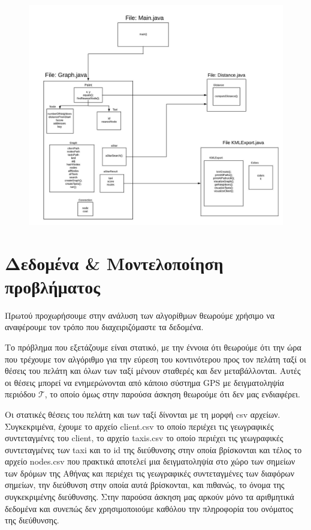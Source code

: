 \documentclass[a4paper,oneside, 11pt]{article}
\begin{document}
\begin{figure}[H]

\includegraphics[width=\textwidth]{architecture.jpeg}
\end{figure}




\section{Δεδομένα \& Μοντελοποίηση προβλήματος}
Πρωτού προχωρήσουμε στην ανάλυση των αλγορίθμων θεωρούμε χρήσιμο να αναφέρουμε τον τρόπο που διαχειριζόμαστε τα δεδομένα. \bigbreak 

Το πρόβλημα που εξετάζουμε είναι στατικό, με την έννοια ότι θεωρούμε ότι την ώρα που τρέχουμε τον αλγόριθμο για την εύρεση του κοντινότερου προς τον πελάτη ταξί οι θέσεις του πελάτη και όλων των ταξί μένουν σταθερές και δεν μεταβάλλονται. Αυτές οι θέσεις μπορεί να ενημερώνονται από κάποιο σύστημα GPS με δειγματοληψία περιόδου $\mathcal{T}$, το οποίο όμως στην παρούσα άσκηση θεωρούμε ότι δεν μας ενδιαφέρει. \bigbreak

Οι στατικές θέσεις του πελάτη και των ταξί δίνονται με τη μορφή csv αρχείων. Συγκεκριμένα, έχουμε το αρχείο client.csv το οποίο περιέχει τις γεωγραφικές συντεταγμένες του client, το αρχείο taxis.csv το οποίο περιέχει τις γεωγραφικές συντεταγμένες των taxi και το id της διεύθυνσης στην οποία βρίσκονται και τέλος το αρχείο nodes.csv που πρακτικά αποτελεί μια δειγματοληψία στο χώρο των σημείων των δρόμων της Αθήνας και περιέχει τις γεωγραφικές συντεταγμένες των διαφόρων σημείων, την διεύθυνση στην οποία αυτά βρίσκονται, και πιθανώς, το όνομα της συγκεκριμένης διεύθυνσης. Στην παρούσα άσκηση μας αρκούν μόνο τα αριθμητικά δεδομένα και συνεπώς δεν χρησιμοποιούμε καθόλου την πληροφορία του ονόματος της διεύθυνσης.  \bigbreak 
\end{document}
